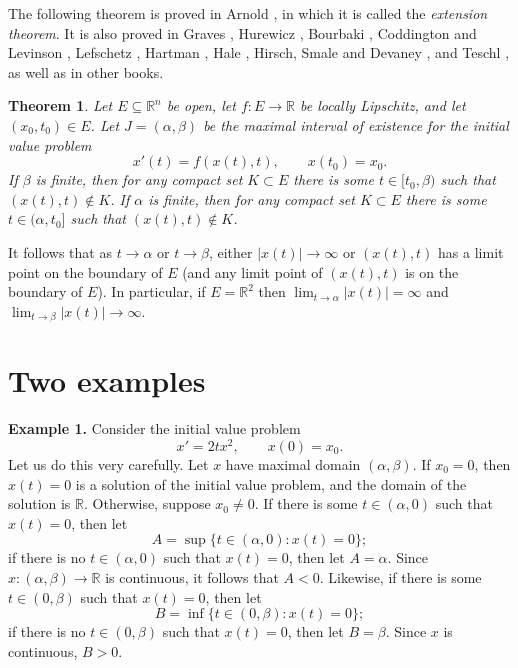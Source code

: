 \documentclass{article}
\newtheorem{theorem}{Theorem}
\begin{document}
The following theorem is proved in Arnold \cite[p.~53, Corollary 5]{arnold}, in which it is called the {\em extension theorem}. It is also proved in Graves \cite{graves}, Hurewicz \cite[p.~17, Corollary]{hurewicz}, Bourbaki \cite[p.~172, Theorem 2]{bourbaki}, Coddington and Levinson \cite[p.~47, Theorem 1.3]{coddington}, Lefschetz \cite[p.~35]{lefschetz}, Hartman \cite[p.~12, Theorem 3.1]{hartman}, Hale \cite{hale}, Hirsch, Smale and Devaney \cite[p.~398, Theorem]{hirsch}, and Teschl \cite[p.~53, Corollary 2.16]{teschl}, as well as in other books.

\begin{theorem}
\label{extension}
Let $E \subseteq \mathbb{R}^n$ be
open, let $f:E \to \mathbb{R}$ be locally Lipschitz, and let $(x_0,t_0) \in E$. Let
$J=(\alpha,\beta)$ be the maximal interval of existence for the initial value problem
\[
x'(t)=f(x(t),t), \qquad x(t_0)=x_0.
\]
If $\beta$ is finite, then for any compact set $K \subset E$ there is some
$t \in [t_0,\beta)$ such that $(x(t),t) \not \in K$. If $\alpha$ is finite, then for any compact set
$K \subset E$ there is some $t \in (\alpha,t_0]$ such that $(x(t),t) \not \in K$.
\end{theorem}

It follows
that as $t \to \alpha$ or $t \to \beta$,
either $|x(t)| \to \infty$ or $(x(t),t)$ has a limit point on the boundary of $E$ (and any limit point of $(x(t),t)$ is on the boundary of $E$). 
In particular, if $E=\mathbb{R}^2$ then $\lim_{t \to \alpha} |x(t)|=\infty$ and $\lim_{t \to \beta} |x(t)| \to \infty$.


\section{Two examples}
\textbf{Example 1.} Consider the initial value problem
\[
x'=2t x^2, \qquad x(0)=x_0.
\]
Let us do this very carefully.
Let $x$ have maximal domain $(\alpha,\beta)$. If $x_0=0$, then $x(t)=0$ is a solution of the initial value problem,
and the domain of the solution is $\mathbb{R}$. Otherwise, suppose $x_0 \neq 0$. If there is some $t \in (\alpha,0)$ such that $x(t)=0$, then let
\[
A=\sup \{t \in (\alpha,0): x(t)=0\};
\]
if there is no $t \in (\alpha,0)$ such that $x(t)=0$, then let $A=\alpha$. Since $x:(\alpha,\beta) \to \mathbb{R}$ is continuous, it follows that $A < 0$.
Likewise, if there is some $t \in (0,\beta)$ such that $x(t)=0$, then let
\[
B=\inf \{t \in (0,\beta): x(t)=0\};
\]
if there is no $t \in (0,\beta)$ such that $x(t)=0$, then let $B=\beta$. Since $x$ is continuous, $B > 0$.
\end{document}
